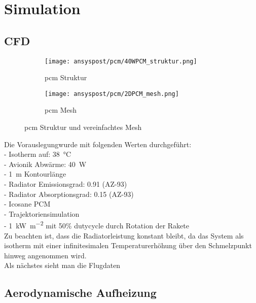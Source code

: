 \chapter{Simulation}\label{chap:Simulation}

\section{CFD}\label{sec:sim_cfd}

\begin{figure}[H]
    \centering
    \begin{subfigure}[t]{0.7\textwidth}
        \centering
        \texttt{[image: ansyspost/pcm/40WPCM\_struktur.png]}
        \caption{\ac{pcm} Struktur}\label{fig:pcm_struktur}
    \end{subfigure}
    \hfill
    \begin{subfigure}[t]{0.15\textwidth}
        \centering
        \texttt{[image: ansyspost/pcm/2DPCM\_mesh.png]}
        \caption{\ac{pcm} Mesh}\label{fig:pcm_mesh}
    \end{subfigure}
    \caption{\ac{pcm} Struktur und vereinfachtes Mesh}\label{fig:pcm_geometrien}
\end{figure}

Die Vorauslegungwurde mit folgenden Werten durchgeführt:\\
- Isotherm auf: \SI{38}{\celsius}\\
- Avionik Abwärme: \SI{40}{W}\\
- \SI{1}{m} Kontourlänge\\
- Radiator Emissionsgrad: \SI{0,91}{} (AZ-93)\\
- Radiator Absorptionsgrad: \SI{0,15}{} (AZ-93)\\
- Icosane PCM\\
- Trajektoriensimulation\\
- \SI{1}{\kilo\watt\per\meter\squared} mit 50\% dutycycle durch Rotation der Rakete\\
Zu beachten ist, dass die Radiatorleistung konstant bleibt, da das System als isotherm mit einer
infinitesimalen Temperaturerhöhung über den Schmelzpunkt hinweg angenommen wird.\\
Als nächstes sieht man die Flugdaten




\section{Aerodynamische Aufheizung}\label{sec:sim_aerodynamisch}

